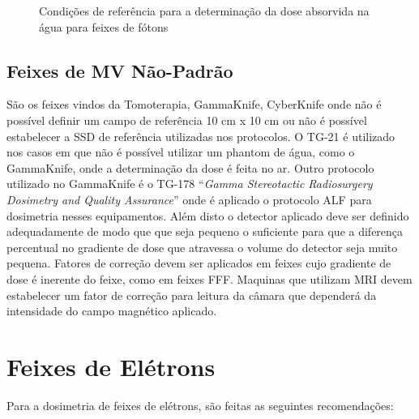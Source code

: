 \documentclass[11pt,a4paper]{article}
\begin{document}
	\begin{figure}[h]
		\centering
		\caption{Condições de referência para a determinação da dose absorvida na água para feixes de fótons}
		\label{fig:condicoesReferenciasDoseFotons}
	\end{figure}

	\subsection{Feixes de MV Não-Padrão}

		São os feixes vindos da Tomoterapia, GammaKnife, CyberKnife onde não é possível definir um campo de referência 10 cm x 10 cm ou não é possível estabelecer a SSD de referência utilizadas nos protocolos. O TG-21 é utilizado nos casos em que não é possível utilizar um phantom de água, como o GammaKnife, onde a determinação da dose é feita no ar. Outro protocolo utilizado no GammaKnife é o TG-178 ``\textit{Gamma Stereotactic Radiosurgery Dosimetry and Quality Assurance}'' onde é aplicado o protocolo ALF para dosimetria nesses equipamentos. Além disto o detector aplicado deve ser definido adequadamente de modo que que seja pequeno o suficiente para que a diferença percentual no gradiente de dose que atravessa o volume do detector seja muito pequena. Fatores de correção devem ser aplicados em feixes cujo gradiente de dose é inerente do feixe, como em feixes FFF. Maquinas que utilizam MRI devem estabelecer um fator de correção para leitura da câmara que dependerá da intensidade do campo magnético aplicado.
	

	\section{Feixes de Elétrons}

	Para a dosimetria de feixes de elétrons, são feitas as seguintes recomendações:
\end{document}
